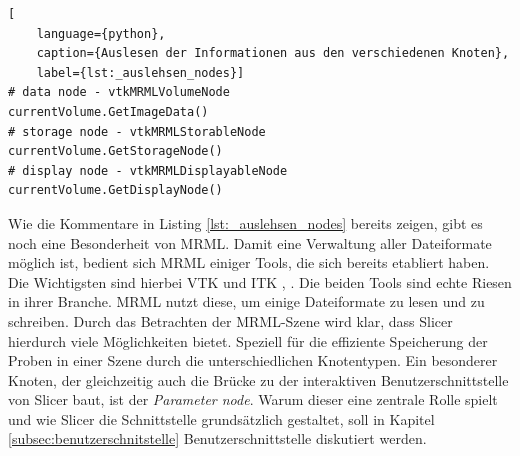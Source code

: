 \begin{lstlisting}[
	language={python},
	caption={Auslesen der Informationen aus den verschiedenen Knoten},
	label={lst:_auslehsen_nodes}]
# data node - vtkMRMLVolumeNode
currentVolume.GetImageData()
# storage node - vtkMRMLStorableNode
currentVolume.GetStorageNode()
# display node - vtkMRMLDisplayableNode
currentVolume.GetDisplayNode()
\end{lstlisting}

Wie die Kommentare in Listing \ref{lst:_auslehsen_nodes} bereits zeigen, gibt es
noch eine Besonderheit von \ac{MRML}. Damit eine Verwaltung aller Dateiformate möglich
ist, bedient sich \ac{MRML} einiger Tools, die sich bereits etabliert haben. Die
Wichtigsten sind hierbei \ac{VTK} und \ac{ITK} \citep[vgl.][K.~1.1]{vtk2006}, \citep[vgl.][K.~1.1]{itkguide2015}.
Die beiden Tools sind echte Riesen in ihrer Branche. \ac{MRML} nutzt diese, um
einige Dateiformate zu lesen und zu schreiben. Durch das Betrachten der \ac{MRML}-Szene
wird klar, dass Slicer hierdurch viele Möglichkeiten bietet. Speziell für die
effiziente Speicherung der Proben in einer Szene durch die unterschiedlichen
Knotentypen. Ein besonderer Knoten, der gleichzeitig auch die Brücke zu der
interaktiven Benutzerschnittstelle von Slicer baut, ist der \textit{Parameter
node}. Warum dieser eine zentrale Rolle spielt und wie Slicer die Schnittstelle grundsätzlich
gestaltet, soll in Kapitel \ref{subsec:benutzerschnitstelle}
Benutzerschnittstelle diskutiert werden.
